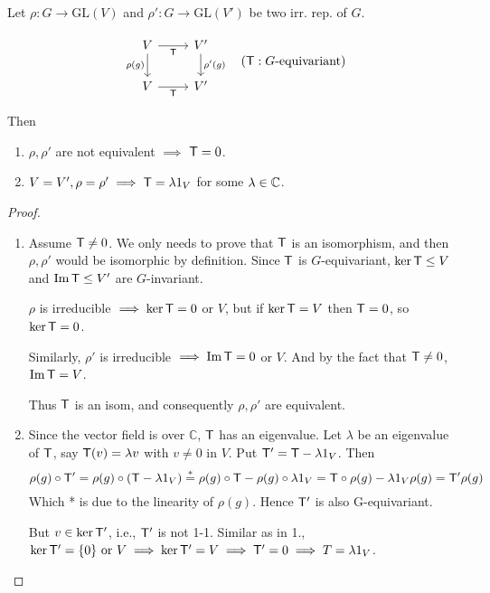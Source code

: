 \begin{lemma}
  Let $\rho: G \to \text{GL}(V)$ and $\rho': G\to \text{GL}(V')$ be two irr.
  rep. of $G$.

  \[
    \begin{tikzcd}
      V \arrow[d, "\rho(g)"'] \arrow[r, "{\sf T}"'] & V' \arrow[d, "\rho'(g)"] \\
      V \arrow[r, "{\sf T}"'] & V'
    \end{tikzcd}
    \quad ({\sf T}: G\text{-equivariant})
  \]

  Then
  \begin{enumerate}
    \item $\rho, \rho'$ are not equivalent $\implies$ ${\sf T} = 0$.
    \item $V = V', \rho = \rho' \implies {\sf T} = \lambda 1_V$ for some
      $\lambda \in \mathbb{C}$.
  \end{enumerate}

  \begin{proof} \mbox{}
    \begin{enumerate}
      \item Assume ${\sf T} \ne 0$. We only needs to prove that ${\sf T}$ is an isomorphism,
        and then $\rho, \rho'$ would be isomorphic by definition.
        Since ${\sf T}$ is $G$-equivariant,
        $\ker {\sf T} \le V$ and $\operatorname{Im} {\sf T}\le V'$ are $G$-invariant.

        $\rho$ is irreducible $\implies \ker {\sf T} = 0$ or $V$, but
        if $\ker {\sf T} = V$ then ${\sf T} = 0$, so $\ker {\sf T} = 0$.

        Similarly, $\rho'$ is irreducible $\implies \operatorname{Im} {\sf T} = 0$ or $V$.
        And by the fact that ${\sf T} \neq 0$, $\operatorname{Im} {\sf T} = V$.

        Thus ${\sf T}$ is an isom, and consequently $\rho, \rho'$ are equivalent.

      \item  Since the vector field is over $\mathbb{C}$, ${\sf T}$ has
        an eigenvalue. Let $\lambda$ be an eigenvalue of ${\sf T}$, say
        ${\sf T}(v) = \lambda v$ with $v \ne 0$ in $V$.
        Put ${\sf T}' = {\sf T} - \lambda 1_V$. Then
        \[ \rho(g) \circ {\sf T}' = \rho(g) \circ ({\sf T} - \lambda 1_V) \stackrel{*}{=}
          \rho(g) \circ {\sf T} - \rho(g) \circ \lambda 1_V =
          {\sf T} \circ \rho(g) - \lambda 1_V \rho(g) = {\sf T}' \rho(g) \]
        Which * is due to the linearity of $\rho(g)$. Hence ${\sf T}'$ is
        also G-equivariant.

        But $v \in \ker {\sf T}'$, i.e., ${\sf T}'$ is not 1-1.
        Similar as in 1., $\ker {\sf T}' = \{0\} \text{ or } V \implies \ker {\sf T}' = V \implies {\sf T'} = 0 \implies
        T = \lambda 1_V$.
    \end{enumerate}
  \end{proof}
\end{lemma}

